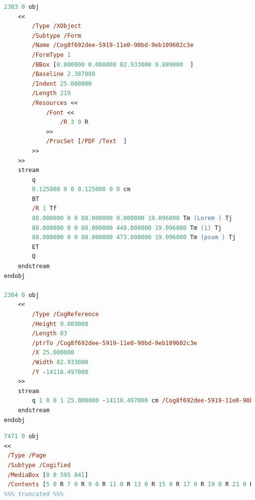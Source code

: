 \begin{lstlisting}[label=lst:pdfcog,captionpos=b,language=postscript,float,basicstyle=\ttfamily\footnotesize,caption={[A \textsc{cog} and its associated spacer object]A \gls{cog} (object 2303) and its associated spacer (object 2304) from a malleable \pdf{}. The \gls{cog} object is never modified. To reposition the \gls{cog} on the page, the spacer object is deleted and replaced with a new one that has the required \texttt{/X} and \texttt{/Y} values set.}]
2303 0 obj
    <<
        /Type /XObject
        /Subtype /Form
        /Name /Cog8f692dee-5919-11e0-90bd-9eb109602c3e
        /FormType 1
        /BBox [0.000000 0.000000 82.933000 9.889000  ]
        /Baseline 2.387000
        /Indent 25.000000
        /Length 219
        /Resources <<
            /Font <<
                /R 3 0 R
            >>
            /ProcSet [/PDF /Text  ]
        >>
    >>
    stream
        q
        0.125000 0 0 0.125000 0 0 cm
        BT
        /R 1 Tf
        88.000000 0 0 88.000000 0.000000 19.096000 Tm (Lorem ) Tj
        88.000000 0 0 88.000000 448.000000 19.096000 Tm (i) Tj
        88.000000 0 0 88.000000 473.000000 19.096000 Tm (psum ) Tj
        ET
        Q
    endstream
endobj

2304 0 obj
    <<
        /Type /CogReference
        /Height 9.889000
        /Length 83
        /ptrTo /Cog8f692dee-5919-11e0-90bd-9eb109602c3e
        /X 25.000000
        /Width 82.933000
        /Y -14118.497000
    >>
    stream
        q 1 0 0 1 25.000000 -14118.497000 cm /Cog8f692dee-5919-11e0-90bd-9eb109602c3e Do Q 
    endstream
endobj
\end{lstlisting}


\begin{lstlisting}[label=lst:pdfpages,captionpos=b,language=postscript,float,basicstyle=\ttfamily\footnotesize,caption={[Contents of a \textsc{pdf} \texttt{Page} object]An excerpt from a malleable \pdf{} file showing that the \texttt{/Contents} of a \texttt{/Page} can be an array of content streams rather than one stream. In this case, each of the objects being pointed to are \gls{cog} spacers, as shown in Listing~\ref{lst:pdfcog}. Consequently, when a spacer object is deleted and a new one created (to reposition a \gls{cog} on the page) the \texttt{/Contents} array must be modified to reflect this.}]
7471 0 obj
<<
 /Type /Page
 /Subtype /Cogified
 /MediaBox [0 0 595 841]
 /Contents [5 0 R 7 0 R 9 0 R 11 0 R 13 0 R 15 0 R 17 0 R 19 0 R 21 0 R 23 0 R 25 0 R 27 0 R 29 0 R 31 0 R 33 0 R 35 0 R 37 0 R 39 0 R 41 0 R 43 0 R 45 0 R 47 0 R 49 0 R 51 0 R 53 0 R 55 0 R 57 0 R 59 0 R 61 0 R 63 0 R 65 0 R 67 0 R 69 0 R 71 0 R 73 0 R 75 0 R 77 0 R 79 0 R 81 0 R 83 0 R 85 0 R 87 0 R 89 0 R 91 0 R 93 0 R 95 0 R 97 0 R 99 0 R 101 0 R 103 0 R 105 0 R 107 0 R 109 0 R 111 0 R 113 0 R 115 0 R 117 0 R 119 0 R 121 0 R 123 0 R 125 0 R 127 0 R
%%% truncated %%%
\end{lstlisting}



